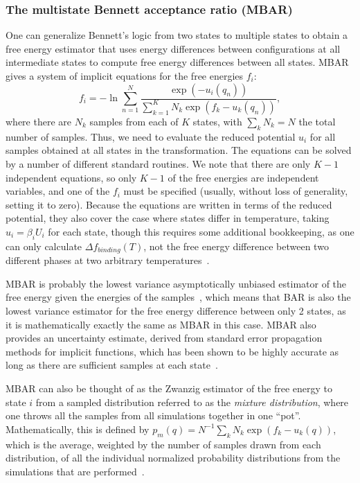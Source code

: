 \subsubsection{The multistate Bennett acceptance ratio (MBAR)}
One can generalize Bennett's logic from two states to multiple states to obtain a free energy estimator that uses energy differences between configurations at all intermediate states to compute free energy differences between all states. MBAR gives a system of implicit equations for the free energies $f_i$:
\begin{equation}
f_i = - \ln \sum_{n=1}^{N} \frac{\exp(-u_i(q_n))}{\sum_{k=1}^K N_k \exp(f_k-u_k(q_n))},
\end{equation}
where there are $N_k$ samples from each of $K$ states, with $\sum_k N_k=N$ the total number of samples. Thus, we need to evaluate the reduced potential $u_i$ for all samples obtained at all states in the transformation. The equations can be solved by a number of different standard routines. We note that there are only $K-1$ independent equations, so only $K-1$ of the free energies are independent variables, and one of the $f_i$ must be specified (usually, without loss of generality, setting it to zero). Because the equations are written in terms of the reduced potential, they also cover the case where states differ in temperature, taking $u_i = \beta_i U_i$ for each state, though this requires some additional bookkeeping, as one can only calculate $\Delta f_{binding}(T)$, not the free energy difference between two different phases at two arbitrary temperatures~\cite{schieber2018reweighting}. 

MBAR is probably the lowest variance asymptotically unbiased estimator of the free energy given the energies of the samples~\cite{tan2004likelihood}, which means that BAR is also the lowest variance estimator for the free energy difference between only 2 states, as it is mathematically exactly the same as MBAR in this case. MBAR also provides an uncertainty estimate, derived from standard error propagation methods for implicit functions, which has been shown to be highly accurate as long as there are sufficient samples at each state~\cite{paliwal2011benchmark}.

MBAR can also be thought of as the Zwanzig estimator of the free energy to state $i$ from a sampled distribution referred to as the \textit{mixture distribution}, where one throws all the samples from all simulations together in one ``pot''. Mathematically, this is defined by $p_m(q) = N^{-1} \sum_k N_k \exp(f_k-u_k(q))$, which is the average, weighted by the number of samples drawn from each distribution, of all the individual normalized probability distributions from the simulations that are performed~\cite{shirts2017reweighting}.

